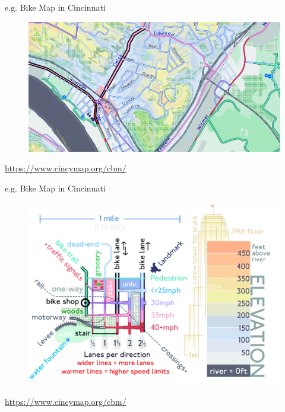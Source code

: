 \documentclass[aspectratio=169]{beamer}
\begin{document}
\begin{frame}
	
	e.g. Bike Map in Cincinnati
	
	\begin{figure}
		\centering
		\includegraphics[width=1\linewidth]{images/bike_map_1.png}
	\end{figure}
	
	\tiny \url{https://www.cincymap.org/cbm/}
	
\end{frame}





\begin{frame}
	
	e.g. Bike Map in Cincinnati
	
	\begin{figure}
		\centering
		\includegraphics[width=0.8\linewidth]{images/bike_map_leg.png}
	\end{figure}
	
	\tiny \url{https://www.cincymap.org/cbm/}
	
\end{frame}
\end{document}
